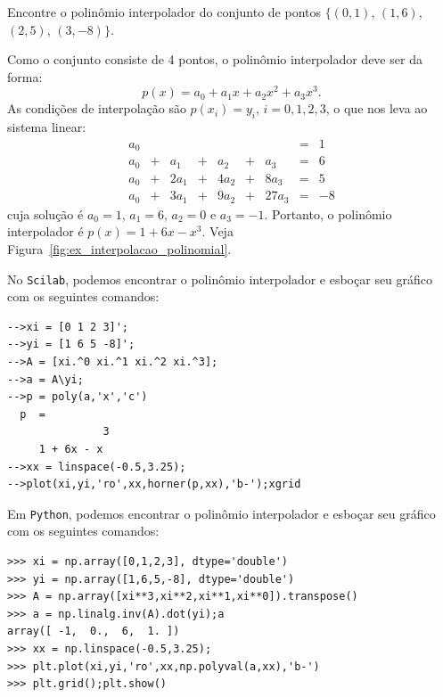 \begin{ex}\label{ex:interpolacao_polinomial} Encontre o polinômio interpolador do conjunto de pontos $\{(0, 1)$, $(1, 6)$, $(2, 5)$, $(3, -8)\}$.
\end{ex}
\begin{sol}
Como o conjunto consiste de 4 pontos, o polinômio interpolador deve ser da forma:
\begin{equation*}
  p(x) = a_0 + a_1x + a_2x^2 + a_3x^3.
\end{equation*}
As condições de interpolação são $p(x_i) = y_i$, $i = 0, 1, 2, 3$, o que nos leva ao sistema linear:
\begin{equation*}
  \begin{array}{lclclclcl}
    a_0& & & & & & &=&1\\
    a_0&+& a_1&+& a_2&+&  a_3&=&6\\
    a_0&+&2a_1&+&4a_2&+& 8a_3&=&5\\
    a_0&+&3a_1&+&9a_2&+&27a_3&=&-8
  \end{array}
\end{equation*}
cuja solução é $a_0=1$, $a_1=6$, $a_2=0$ e $a_3=-1$. Portanto, o polinômio interpolador é $p(x)=1+6x-x^3$. Veja Figura~\ref{fig:ex_interpolacao_polinomial}.

\ifisscilab
No \verb+Scilab+, podemos encontrar o polinômio interpolador e esboçar seu gráfico com os seguintes comandos:
\begin{verbatim}
-->xi = [0 1 2 3]';
-->yi = [1 6 5 -8]'; 
-->A = [xi.^0 xi.^1 xi.^2 xi.^3];
-->a = A\yi; 
-->p = poly(a,'x','c') 
  p  =
               3
     1 + 6x - x   
-->xx = linspace(-0.5,3.25); 
-->plot(xi,yi,'ro',xx,horner(p,xx),'b-');xgrid
\end{verbatim}
\fi
\ifispython
Em \verb+Python+, podemos encontrar o polinômio interpolador e esboçar seu gráfico com os seguintes comandos:
\begin{verbatim}
>>> xi = np.array([0,1,2,3], dtype='double')
>>> yi = np.array([1,6,5,-8], dtype='double')
>>> A = np.array([xi**3,xi**2,xi**1,xi**0]).transpose()
>>> a = np.linalg.inv(A).dot(yi);a
array([ -1,  0.,  6,  1. ])
>>> xx = np.linspace(-0.5,3.25); 
>>> plt.plot(xi,yi,'ro',xx,np.polyval(a,xx),'b-')
>>> plt.grid();plt.show()
\end{verbatim}
\fi
\end{sol}


